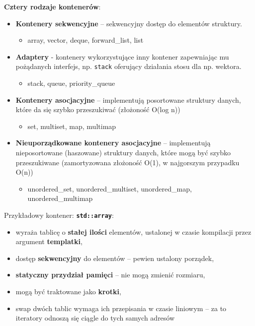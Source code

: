 \documentclass[main.tex]{subfiles}
\begin{document}
    \noindent \textbf{Cztery rodzaje kontenerów}:
    \begin{itemize}[noitemsep]
        \item \textbf{Kontenery sekwencyjne} -- sekwencyjny dostęp do elementów struktury.
        \begin{itemize}
            \item array, vector, deque, forward\_list, list
        \end{itemize}

        \item \textbf{Adaptery} - kontenery wykorzystujące inny kontener zapewniając mu pożądanych interfejs,
        np. \texttt{stack} oferujący działania stosu dla np. wektora.
        \begin{itemize}
            \item stack, queue, priority\_queue
        \end{itemize}

        \item \textbf{Kontenery asocjacyjne} -- implementują posortowane struktury danych, które da się szybko
        przeszukiwać (złożoność O(log n))
        \begin{itemize}
            \item set, multiset, map, multimap
        \end{itemize}

        \item \textbf{Nieuporządkowane kontenery asocjacyjne} -- implementują nieposortowane (haszowane)
        struktury danych, które mogą być szybko przeszukiwane (zamortyzowana złożoność O(1), w najgorszym przypadku O(n))
        \begin{itemize}
            \item unordered\_set, unordered\_multiset, unordered\_map, unordered\_multimap
        \end{itemize}
    \end{itemize}

    \noindent Przykładowy kontener: \textbf{\texttt{std::array}}:
    \begin{itemize}[noitemsep]
        \item wyraża tablicę o \textbf{stałej ilości} elementów, ustalonej w czasie kompilacji przez argument
        \textbf{templatki},
        \item dostęp \textbf{sekwencyjny} do elementów -- pewien ustalony porządek,
        \item \textbf{statyczny przydział pamięci} -- nie mogą zmienić rozmiaru,
        \item mogą być traktowane jako \textbf{krotki},
        \item swap dwóch tablic wymaga ich przepisania w czasie liniowym -- za to iteratory odnoszą się ciągle
        do tych samych adresów
    \end{itemize}
\end{document}
